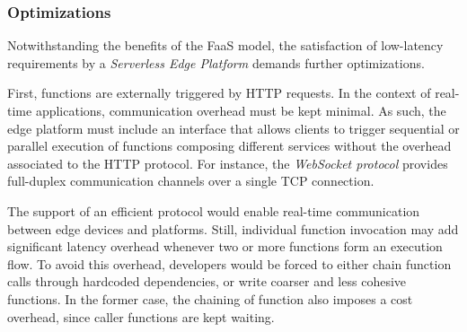 







\subsubsection{Optimizations}
Notwithstanding the benefits of the FaaS model,
the satisfaction of low-latency requirements by a \textit{Serverless Edge Platform} demands further optimizations.

First, functions are externally triggered by HTTP requests. In the context of real-time applications, communication overhead must be kept minimal. As such, the edge platform must include an interface that allows clients to trigger sequential or parallel execution of functions composing different services without the overhead associated to the HTTP protocol. For instance, the \textit{WebSocket protocol}
provides full-duplex communication channels over a single TCP connection. %


The support of an efficient protocol would enable real-time communication between edge devices and platforms. Still, individual function invocation may add significant latency overhead whenever two or more functions form an execution flow. To avoid this overhead, developers would be forced to either chain function calls through hardcoded dependencies, or write coarser and less cohesive functions. In the former case, the chaining of function also imposes a cost overhead, since caller functions are kept waiting.%

